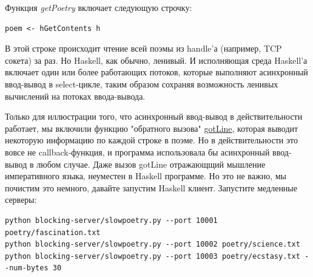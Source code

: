 Функция \textit{getPoetry} включает следующую строчку:

\begin{scriptsize}\begin{verbatim}
poem <- hGetContents h
\end{verbatim}\end{scriptsize}


В этой строке происходит чтение всей поэмы из handle'а (например, TCP сокета) 
за раз. Но Haskell, как обычно, ленивый. И исполняющая среда  Haskell'а 
включает один или более работающих потоков, которые выполняют 
асинхронный ввод-вывод в select-цикле, таким образом сохраняя  
возможность ленивых вычислений на потоках ввода-вывода.
 

Только для иллюстрации того, что асинхронный ввод-вывод в 
действительности работает, мы включили функцию "обратного вызова" 
\href{https://github.com/jdavisp3/twisted-intro/blob/master/haskell-client-1/get-poetry.hs#L60}{gotLine}, 
которая выводит некоторую информацию по каждой строке в 
поэме. Но в действительности это вовсе не callback-функция, и 
программа использовала бы асинхронный ввод-вывод в любом случае. 
Даже вызов gotLine отражающщий мышление императивного языка, 
неуместен в Haskell программе. Но это не важно, мы почистим это немного, 
давайте запустим Haskell клиент. Запустите медленные серверы: 

\begin{scriptsize}\begin{verbatim}
python blocking-server/slowpoetry.py --port 10001 poetry/fascination.txt
python blocking-server/slowpoetry.py --port 10002 poetry/science.txt
python blocking-server/slowpoetry.py --port 10003 poetry/ecstasy.txt --num-bytes 30
\end{verbatim}\end{scriptsize}

